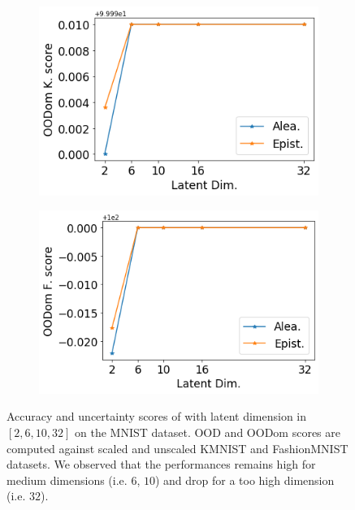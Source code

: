\begin{figure}[ht]
    \begin{subfigure}[t]{0.33 \textwidth}
        \centering
        \includegraphics[width=1. \textwidth]{sections/006_neurips2020/figures/lat_dim_minst_ood_3.png}
    \end{subfigure}%
    \begin{subfigure}[t]{0.33 \textwidth}
        \centering
        \includegraphics[width=1. \textwidth]{sections/006_neurips2020/figures/lat_dim_minst_ood_4.png}
    \end{subfigure}%

    \caption{Accuracy and uncertainty scores of \oursacro with latent dimension in $[2, 6, 10, 32]$ on the MNIST dataset. OOD and OODom scores are computed against scaled and unscaled KMNIST and FashionMNIST datasets. We observed that the performances remains high for medium dimensions (i.e. $6$, $10$) and drop for a too high dimension (i.e. $32$).}
    \label{fig:latent_dim_MNIST}
\end{figure}

